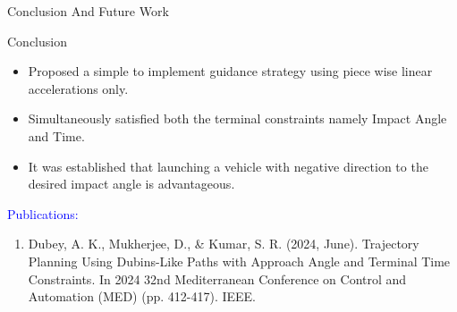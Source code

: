 \begin{frame}{Conclusion And Future Work}
	\begin{block}{Conclusion}
		\begin{itemize}
			\item Proposed a simple to implement guidance strategy using piece wise linear accelerations only.
			\item Simultaneously satisfied both the terminal constraints namely Impact Angle and Time.
			\item It was established that launching a vehicle with negative direction to the desired impact angle is advantageous.
		\end{itemize}
	\end{block}
	\textcolor{blue}{Publications: }\\
	\begin{enumerate}
		\item Dubey, A. K., Mukherjee, D., \& Kumar, S. R. (2024, June). Trajectory Planning Using Dubins-Like Paths with Approach Angle and Terminal Time Constraints. In 2024 32nd Mediterranean Conference on Control and Automation (MED) (pp. 412-417). IEEE.
	\end{enumerate}	
\end{frame}

